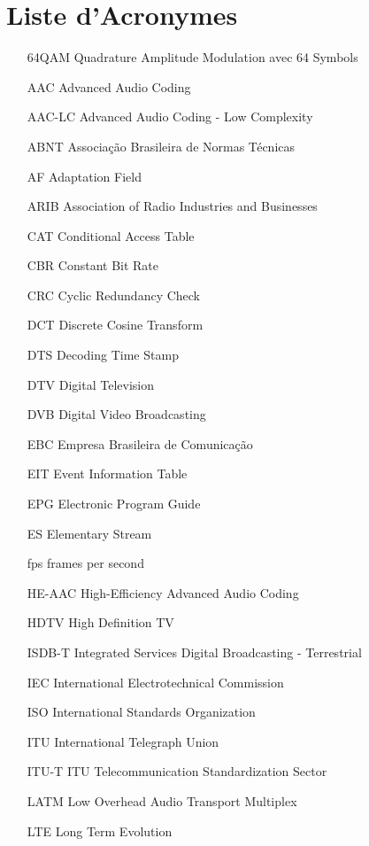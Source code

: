 \documentclass[12pt,a4paper]{article}
\begin{document}
\newpage
\-\-\-
\newpage
{}

\section*{Liste d'Acronymes}
\begin{itemize}
  \item[64QAM] Quadrature Amplitude Modulation avec 64 Symbols
  \item[AAC] Advanced Audio Coding
  \item[AAC-LC] Advanced Audio Coding - Low Complexity
  \item[ABNT] Associação Brasileira de Normas Técnicas
  \item[AF] Adaptation Field
  \item[ARIB] Association of Radio Industries and Businesses
  \item[CAT] Conditional Access Table
  \item[CBR] Constant Bit Rate
  \item[CRC] Cyclic Redundancy Check
  \item[DCT] Discrete Cosine Transform
  \item[DTS] Decoding Time Stamp
  \item[DTV] Digital Television
  \item[DVB] Digital Video Broadcasting
  \item[EBC] Empresa Brasileira de Comunicação
  \item[EIT] Event Information Table
  \item[EPG] Electronic Program Guide
  \item[ES] Elementary Stream
  \item[fps] frames per second
  \item[HE-AAC] High-Efficiency Advanced Audio Coding
  \item[HDTV] High Definition TV
  \item[ISDB-T] Integrated Services Digital Broadcasting - Terrestrial
  \item[IEC] International Electrotechnical Commission
  \item[ISO] International Standards Organization
  \item[ITU] International Telegraph Union
  \item[ITU-T] ITU Telecommunication Standardization Sector
  \item[LATM] Low Overhead Audio Transport Multiplex
  \item[LTE] Long Term Evolution

\end{itemize}
\end{document}
